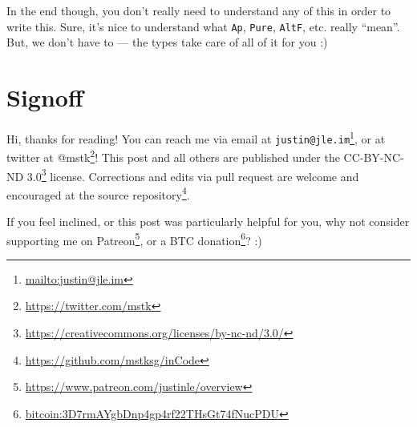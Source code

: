 \documentclass[]{article}
\renewcommand{\href}[2]{#2\footnote{\url{#1}}}
\begin{document}
In the end though, you don't really need to understand any of this in order to
write this. Sure, it's nice to understand what \texttt{Ap}, \texttt{Pure},
\texttt{AltF}, etc. really ``mean''. But, we don't have to --- the types take
care of all of it for you :)

\hypertarget{signoff}{%
\section{Signoff}\label{signoff}}

Hi, thanks for reading! You can reach me via email at
\href{mailto:justin@jle.im}{\nolinkurl{justin@jle.im}}, or at twitter at
\href{https://twitter.com/mstk}{@mstk}! This post and all others are published
under the \href{https://creativecommons.org/licenses/by-nc-nd/3.0/}{CC-BY-NC-ND
3.0} license. Corrections and edits via pull request are welcome and encouraged
at \href{https://github.com/mstksg/inCode}{the source repository}.

If you feel inclined, or this post was particularly helpful for you, why not
consider \href{https://www.patreon.com/justinle/overview}{supporting me on
Patreon}, or a \href{bitcoin:3D7rmAYgbDnp4gp4rf22THsGt74fNucPDU}{BTC donation}?
:)
\end{document}
